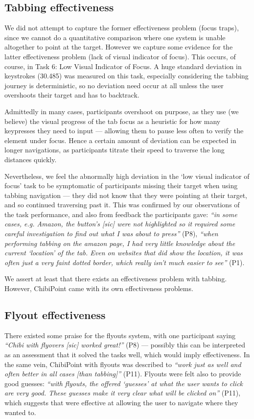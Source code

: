 \documentclass[11pt,openright,a4paper]{report}
\begin{document}
\subsection{Tabbing effectiveness}
\label{sec:tabbing_effectiveness}
We did not attempt to capture the former effectiveness problem (focus traps), since we cannot do a quantitative comparison where one system is unable altogether to point at the target. However we capture some evidence for the latter effectiveness problem (lack of visual indicator of focus). This occurs, of course, in Task 6: Low Visual Indicator of Focus. A huge standard deviation in keystrokes (30.485) was measured on this task, especially considering the tabbing journey is deterministic, so no deviation need occur at all unless the user overshoots their target and has to backtrack.

Admittedly in many cases, participants overshoot on purpose, as they use (we believe) the visual progress of the tab focus as a heuristic for how many keypresses they need to input --- allowing them to pause less often to verify the element under focus. Hence a certain amount of deviation can be expected in longer navigations, as participants titrate their speed to traverse the long distances quickly.

Nevertheless, we feel the abnormally high deviation in the `low visual indicator of focus' task to be symptomatic of participants missing their target when using tabbing navigation --- they did not know that they were pointing at their target, and so continued traversing past it. This was confirmed by our observations of the task performance, and also from feedback the participants gave: \textit{``in some cases, e.g. Amazon, the button's [sic] were not highlighted so it required some careful investigation to find out what I was about to press''} (P8), \textit{``when performing tabbing on the amazon page, I had very little knowledge about the current `location' of the tab. Even on websites that did show the location, it was often just a very faint dotted border, which really isn't much easier to see''} (P1).

We assert at least that there exists an effectiveness problem with tabbing. However, ChibiPoint came with its own effectiveness problems.

\subsection{Flyout effectiveness}
\label{sec:flyout_effectiveness}
There existed some praise for the flyouts system, with one participant saying \textit{``Chibi with flyovers [sic] worked great!''} (P8) --- possibly this can be interpreted as an assessment that it solved the tasks well, which would imply effectiveness. In the same vein, ChibiPoint with flyouts was described to \textit{``work just as well and often better in all cases [than tabbing]''} (P11). Flyouts were felt also to provide good guesses: \textit{``with flyouts, the offered `guesses' at what the user wants to click are very good. These guesses make it very clear what will be clicked on''} (P11), which suggests that were effective at allowing the user to navigate where they wanted to.
\end{document}
